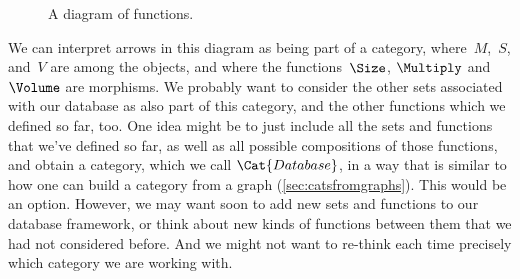 

\begin{figure}[h!]
  \begin{center}
  \end{center}
  \caption{A diagram of functions. \label{fig:diagram_functions}}
\end{figure}

We can interpret arrows in this diagram as being part of a category, where~$M$,~$S$, and~$V$ are among the objects, and where the functions~$\Size$, $\Multiply$ and~$\Volume$ are morphisms. We probably want to consider the other sets associated with our database as also part of this category, and the other functions which we defined so far, too. One idea might be to just include all the sets and functions that we've defined so far, as well as all possible compositions of those functions, and obtain a category, which we call $\Cat{Database}$, in a way that is similar to how one can build a category from a graph (\cref{sec:catsfromgraphs}). This would be an option. However, we may want soon to add new sets and functions to our database framework, or think about new kinds of functions between them that we had not considered before. And we might not want to re-think each time precisely which category we are working with.

